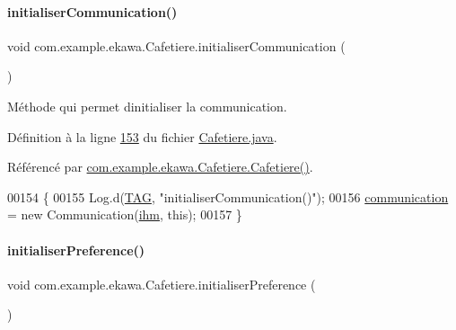 \paragraph{\texorpdfstring{initialiser\+Communication()}{initialiserCommunication()}}
{\footnotesize\ttfamily void com.\+example.\+ekawa.\+Cafetiere.\+initialiser\+Communication (\begin{DoxyParamCaption}{ }\end{DoxyParamCaption})\hspace{0.3cm}{\ttfamily [private]}}



Méthode qui permet d\textquotesingle{}initialiser la communication. 



Définition à la ligne \hyperlink{_cafetiere_8java_source_l00153}{153} du fichier \hyperlink{_cafetiere_8java_source}{Cafetiere.\+java}.



Référencé par \hyperlink{_cafetiere_8java_source_l00108}{com.\+example.\+ekawa.\+Cafetiere.\+Cafetiere()}.


\begin{DoxyCode}
00154     \{
00155         Log.d(\hyperlink{classcom_1_1example_1_1ekawa_1_1_cafetiere_aa0c1fd99a2508b06c462aea17034aa91}{TAG}, \textcolor{stringliteral}{"initialiserCommunication()"});
00156         \hyperlink{classcom_1_1example_1_1ekawa_1_1_cafetiere_af9506a7805d000d2cb83444cdb8ea889}{communication} = \textcolor{keyword}{new} Communication(\hyperlink{classcom_1_1example_1_1ekawa_1_1_cafetiere_a7db4a63088834eda5f6a3e951611bf82}{ihm}, \textcolor{keyword}{this});
00157     \}
\end{DoxyCode}
\mbox{\label{classcom_1_1example_1_1ekawa_1_1_cafetiere_a20f3b74112d4e668a382882c4c8ccd07}} 
\paragraph{\texorpdfstring{initialiser\+Preference()}{initialiserPreference()}}
{\footnotesize\ttfamily void com.\+example.\+ekawa.\+Cafetiere.\+initialiser\+Preference (\begin{DoxyParamCaption}{ }\end{DoxyParamCaption})\hspace{0.3cm}{\ttfamily [private]}}



